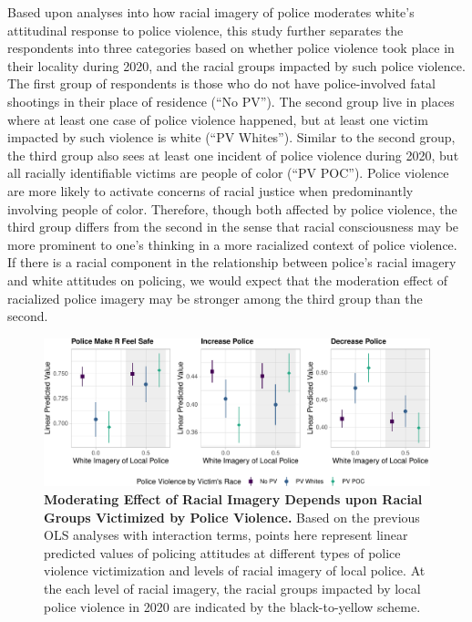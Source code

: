 \documentclass[
  12pt,
]{article}
\begin{document}
Based upon analyses into how racial imagery of police moderates white's
attitudinal response to police violence, this study further separates
the respondents into three categories based on whether police violence
took place in their locality during 2020, and the racial groups impacted
by such police violence. The first group of respondents is those who do
not have police-involved fatal shootings in their place of residence
(``No PV''). The second group live in places where at least one case of
police violence happened, but at least one victim impacted by such
violence is white (``PV Whites''). Similar to the second group, the
third group also sees at least one incident of police violence during
2020, but all racially identifiable victims are people of color (``PV
POC''). Police violence are more likely to activate concerns of racial
justice when predominantly involving people of color. Therefore, though
both affected by police violence, the third group differs from the
second in the sense that racial consciousness may be more prominent to
one's thinking in a more racialized context of police violence. If there
is a racial component in the relationship between police's racial
imagery and white attitudes on policing, we would expect that the
moderation effect of racialized police imagery may be stronger among the
third group than the second.

\begin{figure}[tb]

{\centering \includegraphics{racialized-police_files/figure-pdf/fig-racial-component-1.pdf}

}

\caption{\label{fig-racial-component}\textbf{Moderating Effect of Racial
Imagery Depends upon Racial Groups Victimized by Police Violence.} Based
on the previous OLS analyses with interaction terms, points here
represent linear predicted values of policing attitudes at different
types of police violence victimization and levels of racial imagery of
local police. At the each level of racial imagery, the racial groups
impacted by local police violence in 2020 are indicated by the
black-to-yellow scheme.}

\end{figure}
\end{document}
